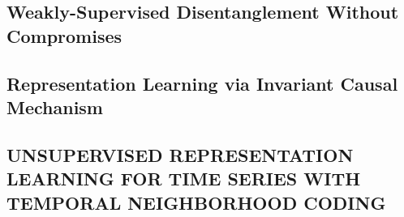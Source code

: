 \subsection{Weakly-Supervised Disentanglement Without Compromises}


\subsection{Representation Learning via Invariant Causal Mechanism}


\subsection{UNSUPERVISED REPRESENTATION LEARNING FOR TIME SERIES WITH TEMPORAL NEIGHBORHOOD CODING}
